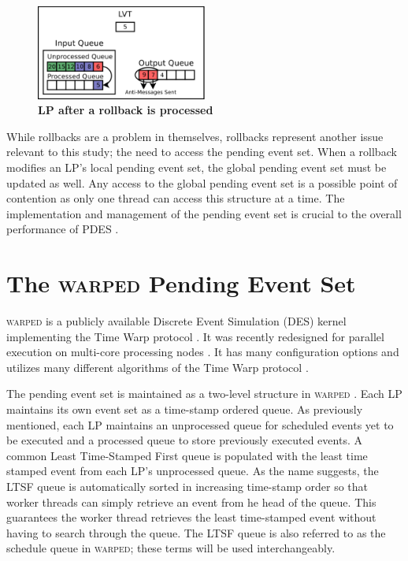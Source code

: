 \documentclass[11pt]{book}
\begin{document}
\begin{figure}[H]
    \centering
    \graphicspath{ {./figures/} }
    \includegraphics[width=0.5\textwidth,keepaspectratio]{rollback_processed}
    \caption{\textbf{LP after a rollback is processed}}
    \label{fig:rollback_processed}
\end{figure}

While rollbacks are a problem in themselves, rollbacks represent another issue relevant to
this study; the need to access the pending event set.  When a rollback modifies an LP's
local pending event set, the global pending event set must be updated as well.  Any access
to the global pending event set is a possible point of contention as only one thread can
access this structure at a time.  The implementation and management of the pending event
set is crucial to the overall performance of PDES \cite{twpes}.

\section{The \textsc{warped} Pending Event Set}

\textsc{warped} is a publicly available Discrete Event Simulation (DES) kernel implementing the
Time Warp protocol \cite{martin,fujimoto}.  It was recently redesigned for parallel
execution on multi-core processing nodes \cite{muthalagu}.  It has many configuration
options and utilizes many different algorithms of the Time Warp protocol \cite{fujimoto}.

The pending event set is maintained as a two-level structure in \textsc{warped}
\cite{dickman}.  Each LP maintains its own event set as a time-stamp ordered
queue.  As previously mentioned, each LP maintains an unprocessed queue for
scheduled events yet to be executed and a processed queue to store previously
executed events.  A common Least Time-Stamped First queue is populated with the
least time stamped event from each LP's unprocessed queue.  As the name
suggests, the LTSF queue is automatically sorted in increasing time-stamp order
so that worker threads can simply retrieve an event from he head of the queue.
This guarantees the worker thread retrieves the least time-stamped event without
having to search through the queue. The LTSF queue is also referred to as the
schedule queue in \textsc{warped}; these terms will be used interchangeably.
\end{document}
